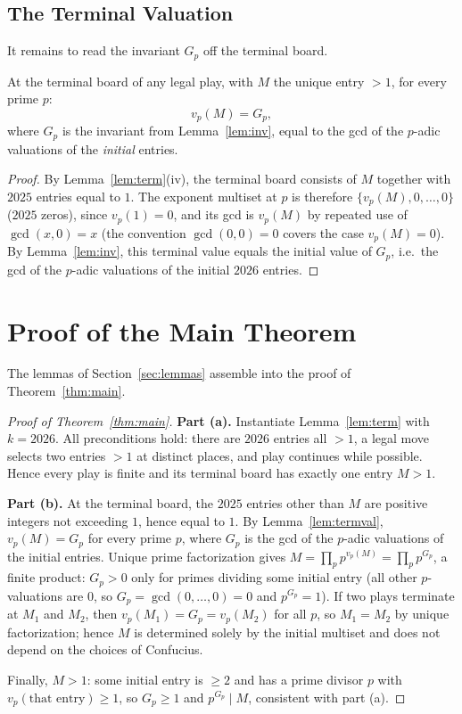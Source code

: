 \documentclass{article}
\begin{document}
\subsection{The Terminal Valuation}

It remains to read the invariant $G_p$ off the terminal board.

\begin{lemma}\label{lem:termval}
At the terminal board of any legal play, with $M$ the unique entry $>1$, for
every prime $p$:
\[
v_p(M)=G_p,
\]
where $G_p$ is the invariant from Lemma~\ref{lem:inv}, equal to the gcd of the
$p$-adic valuations of the \emph{initial} entries.
\end{lemma}
\begin{proof}
By Lemma~\ref{lem:term}(iv), the terminal board consists of $M$ together with
$2025$ entries equal to $1$. The exponent multiset at $p$ is therefore
$\{v_p(M),0,\dots,0\}$ ($2025$ zeros), since $v_p(1)=0$, and its gcd is
$v_p(M)$ by repeated use of $\gcd(x,0)=x$ (the convention $\gcd(0,0)=0$ covers
the case $v_p(M)=0$). By Lemma~\ref{lem:inv}, this terminal value equals the
initial value of $G_p$, i.e.\ the gcd of the $p$-adic valuations of the initial
$2026$ entries.
\end{proof}

\section{Proof of the Main Theorem}\label{sec:proofmain}

The lemmas of Section~\ref{sec:lemmas} assemble into the proof of
Theorem~\ref{thm:main}.

\begin{proof}[Proof of Theorem~\ref{thm:main}]
\textbf{Part (a).} Instantiate Lemma~\ref{lem:term} with $k=2026$. All
preconditions hold: there are $2026$ entries all $>1$, a legal move selects two
entries $>1$ at distinct places, and play continues while possible. Hence every
play is finite and its terminal board has exactly one entry $M>1$.

\textbf{Part (b).} At the terminal board, the $2025$ entries other than $M$ are
positive integers not exceeding $1$, hence equal to $1$. By
Lemma~\ref{lem:termval}, $v_p(M)=G_p$ for every prime $p$, where $G_p$ is the
gcd of the $p$-adic valuations of the initial entries. Unique prime
factorization gives $M=\prod_p p^{v_p(M)}=\prod_p p^{G_p}$, a finite product:
$G_p>0$ only for primes dividing some initial entry (all other $p$-valuations
are $0$, so $G_p=\gcd(0,\dots,0)=0$ and $p^{G_p}=1$). If two plays terminate at
$M_1$ and $M_2$, then $v_p(M_1)=G_p=v_p(M_2)$ for all $p$, so $M_1=M_2$ by
unique factorization; hence $M$ is determined solely by the initial multiset
and does not depend on the choices of Confucius.

Finally, $M>1$: some initial entry is $\geq 2$ and has a prime divisor $p$ with
$v_p(\text{that entry})\geq 1$, so $G_p\geq 1$ and $p^{G_p}\mid M$, consistent
with part (a).
\end{proof}
\end{document}
